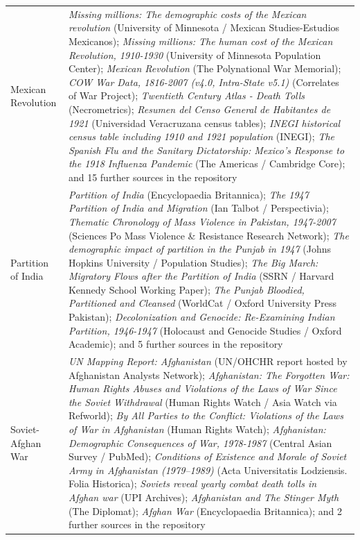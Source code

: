 \documentclass[11pt]{article}
\begin{document}
\begin{scriptsize}
\begin{longtable}{p{3.5cm} p{12.5cm}}
\addlinespace
Mexican Revolution & \emph{Missing millions: The demographic costs of the Mexican revolution} (University of Minnesota / Mexican Studies-Estudios Mexicanos); \emph{Missing millions: The human cost of the Mexican Revolution, 1910-1930} (University of Minnesota Population Center); \emph{Mexican Revolution} (The Polynational War Memorial); \emph{COW War Data, 1816-2007 (v4.0, Intra-State v5.1)} (Correlates of War Project); \emph{Twentieth Century Atlas - Death Tolls} (Necrometrics); \emph{Resumen del Censo General de Habitantes de 1921} (Universidad Veracruzana census tables); \emph{INEGI historical census table including 1910 and 1921 population} (INEGI); \emph{The Spanish Flu and the Sanitary Dictatorship: Mexico's Response to the 1918 Influenza Pandemic} (The Americas / Cambridge Core); and 15 further sources in the repository \\
\addlinespace
Partition of India & \emph{Partition of India} (Encyclopaedia Britannica); \emph{The 1947 Partition of India and Migration} (Ian Talbot / Perspectivia); \emph{Thematic Chronology of Mass Violence in Pakistan, 1947-2007} (Sciences Po Mass Violence \& Resistance Research Network); \emph{The demographic impact of partition in the Punjab in 1947} (Johns Hopkins University / Population Studies); \emph{The Big March: Migratory Flows after the Partition of India} (SSRN / Harvard Kennedy School Working Paper); \emph{The Punjab Bloodied, Partitioned and Cleansed} (WorldCat / Oxford University Press Pakistan); \emph{Decolonization and Genocide: Re-Examining Indian Partition, 1946-1947} (Holocaust and Genocide Studies / Oxford Academic); and 5 further sources in the repository \\
\addlinespace
Soviet-Afghan War & \emph{UN Mapping Report: Afghanistan} (UN/OHCHR report hosted by Afghanistan Analysts Network); \emph{Afghanistan: The Forgotten War: Human Rights Abuses and Violations of the Laws of War Since the Soviet Withdrawal} (Human Rights Watch / Asia Watch via Refworld); \emph{By All Parties to the Conflict: Violations of the Laws of War in Afghanistan} (Human Rights Watch); \emph{Afghanistan: Demographic Consequences of War, 1978-1987} (Central Asian Survey / PubMed); \emph{Conditions of Existence and Morale of Soviet Army in Afghanistan (1979–1989)} (Acta Universitatis Lodziensis. Folia Historica); \emph{Soviets reveal yearly combat death tolls in Afghan war} (UPI Archives); \emph{Afghanistan and The Stinger Myth} (The Diplomat); \emph{Afghan War} (Encyclopaedia Britannica); and 2 further sources in the repository \\

\end{longtable}
\end{scriptsize}
\end{document}
